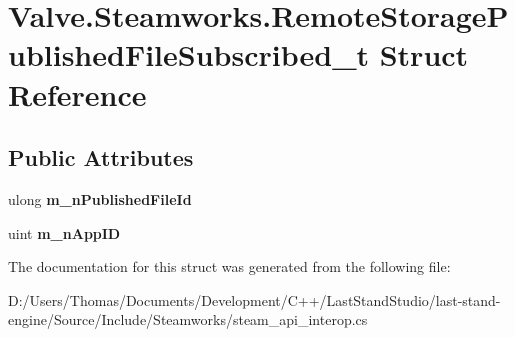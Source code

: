 \hypertarget{structValve_1_1Steamworks_1_1RemoteStoragePublishedFileSubscribed__t}{}\section{Valve.\+Steamworks.\+Remote\+Storage\+Published\+File\+Subscribed\+\_\+t Struct Reference}
\label{structValve_1_1Steamworks_1_1RemoteStoragePublishedFileSubscribed__t}
\subsection*{Public Attributes}
\begin{DoxyCompactItemize}
\item 
\hypertarget{structValve_1_1Steamworks_1_1RemoteStoragePublishedFileSubscribed__t_add7ce96642e1a6533ebb839a37ba8b98}{}ulong {\bfseries m\+\_\+n\+Published\+File\+Id}\label{structValve_1_1Steamworks_1_1RemoteStoragePublishedFileSubscribed__t_add7ce96642e1a6533ebb839a37ba8b98}

\item 
\hypertarget{structValve_1_1Steamworks_1_1RemoteStoragePublishedFileSubscribed__t_ab093ea8e945b9d7b5bc6a8ac8ac4d87a}{}uint {\bfseries m\+\_\+n\+App\+I\+D}\label{structValve_1_1Steamworks_1_1RemoteStoragePublishedFileSubscribed__t_ab093ea8e945b9d7b5bc6a8ac8ac4d87a}

\end{DoxyCompactItemize}


The documentation for this struct was generated from the following file\+:\begin{DoxyCompactItemize}
\item 
D\+:/\+Users/\+Thomas/\+Documents/\+Development/\+C++/\+Last\+Stand\+Studio/last-\/stand-\/engine/\+Source/\+Include/\+Steamworks/steam\+\_\+api\+\_\+interop.\+cs\end{DoxyCompactItemize}
